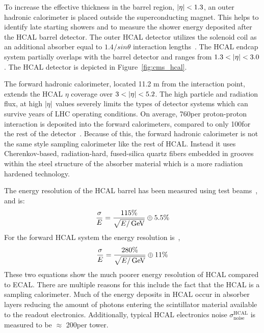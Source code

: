 To increase the effective thickness in the barrel region, $\lvert\eta\rvert < 1.3$, an outer hadronic calorimeter is placed 
outside the superconducting magnet. This helps to identify late starting showers and 
to measure the shower energy deposited after the HCAL barrel detector.
The outer HCAL detector utilizes the solenoid coil as an additional absorber equal to 
$1.4/sin\theta$ interaction lengths~\cite{Chatrchyan:2008zzk}.
The HCAL endcap system partially overlaps with the barrel detector and ranges from
$1.3 < \lvert\eta\rvert < 3.0$.
The HCAL detector is depicted in Figure~\ref{fig:cms_hcal}.

The forward hadronic calorimeter, located
11.2 m from the interaction point, extends the HCAL $\eta$ coverage over $3 < \lvert\eta\rvert < 5.2$.
The high particle and radiation flux, at high $\lvert\eta\rvert$ values
severely limits the types of detector systems which can survive years of LHC operating
conditions. On average, 760\GeV per proton-proton interaction is deposited into the forward 
calorimeters, compared to only 100\GeV for the rest of the detector~\cite{Chatrchyan:2008zzk}.
Because of this, the forward hadronic calorimeter is not the same style sampling
calorimeter like the rest of HCAL. Instead it uses Cherenkov-based, 
radiation-hard, fused-silica quartz fibers embedded in grooves within the steel structure
of the absorber material which is a more radiation hardened technology.

The energy resolution of the HCAL barrel has been measured using test beams~\cite{Elvira:800406}, and is:
\begin{equation}
\label{eqn:hcal_res}
\frac{\sigma}{E} = \frac{115\%}{\sqrt{E/\,\mathrm{GeV}}} \oplus 5.5\%
\end{equation}
For the forward HCAL system the energy resolution is~\cite{Baiatian:951395},
\begin{equation}
\label{eqn:hcal_res}
\frac{\sigma}{E} = \frac{280\%}{\sqrt{E/\,\mathrm{GeV}}} \oplus 11\%
\end{equation}
These two equations show the much poorer energy resolution of HCAL compared to ECAL.
There are multiple reasons for this include the fact that the HCAL is a sampling 
calorimeter. Much of the energy deposits in HCAL occur in absorber layers reducing
the amount of photons entering the scintillator material available to the readout electronics.
Additionally, typical HCAL electronics noise $\sigma ^{\text{HCAL}} _{\text{noise}}$ 
is measured to be $\approx$ 200\MeV per tower.

